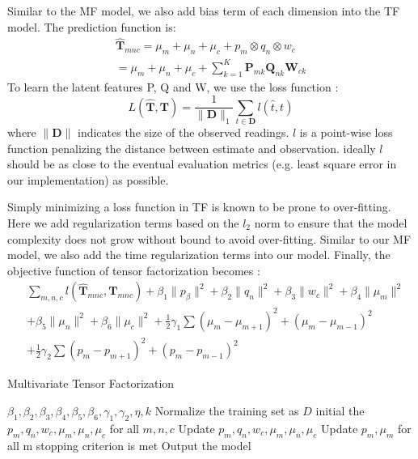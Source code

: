 Similar to the MF model, we also add bias term of each dimension into the TF model. The prediction function is:
\begin{equation*}
\begin{aligned}
\mathbf{\hat{T}}_{mnc}=\mu_m+\mu_n+\mu_c+p_m \otimes q_n\otimes  w_c
\\=\mu_m+\mu_n+\mu_c+\sum\limits_{k=1}^{K}\mathbf{P}_{m k} \mathbf{Q}_{n k} \mathbf{W}_{c k}
\end{aligned}
\end{equation*}
To learn the latent features P, Q and W, we use the loss function :
\begin{equation*}
L(\mathbf{\hat{T}},\mathbf{T})=\frac{1}{\|\mathbf{D}\|_1} \sum\limits_{t\in \mathbf{D}}  l(\hat{t},t)
\end{equation*}
where $\|\mathbf{D}\|$ indicates the size of the observed readings.
$l$ is a point-wise loss function penalizing the distance between estimate and observation.
ideally $l$ should be as close to the eventual evaluation metrics (e.g. least square error in our implementation) as possible.

Simply minimizing a loss function in TF is known to be prone to over-fitting. Here we add regularization terms based on the $l_2$ norm to ensure that the model complexity does not grow without bound to avoid over-fitting.
Similar to our MF model, we also add the time regularization terms into our model.
Finally, the objective function of tensor factorization becomes :\\
\begin{equation*}
\begin{aligned}
&\sum\limits_{m, n, c} l( \hat{\mathbf{T}}_{mnc}, \mathbf{T}_{mnc} )+\beta_1\|p_{\beta}\|^2+\beta_2\|q_n\|^2+\beta_3\|w_c\|^2+\beta_4\|
\mu_m\|^2\\
&+\beta_5\|\mu_n\|^2+\beta_6\|\mu_c\|^2+\frac{1}{2}\gamma_1\sum(\mu_m-\mu_{m+1})^2+(\mu_m-\mu_{m-1})^2
\\&
+\frac{1}{2}\gamma_2\sum(p_m-p_{m+1})^2+(p_m-p_{m-1})^2
\end{aligned}
\end{equation*}

\begin{algorithm}[h]
  \caption{Multivariate Tensor Factorization}
  \label{alg::conjugateGradient}
  \begin{algorithmic}[1]
    \Require
    $\beta_1,\beta_2, \beta_3, \beta_4, \beta_5, \beta_6, \gamma_1, \gamma_2, \eta, k$
    \State Normalize the training set as $D$
    \State initial the $p_m, q_n, w_c, \mu_m, \mu_n, \mu_c$ for all $m, n, c$
    \Repeat
      \State Update $p_m, q_n, w_c, \mu_m, \mu_n, \mu_c$ 
     \EndFor
     \State Update $p_m,  \mu_m $ for all m
    \Until stopping criterion is met
    \State Output the model 
  \end{algorithmic}
\end{algorithm}


